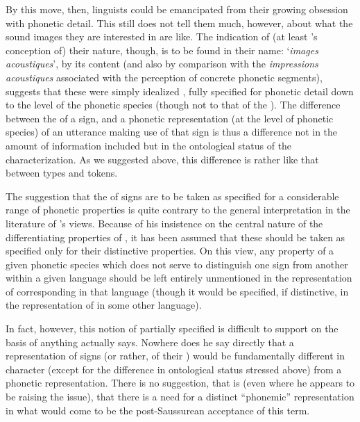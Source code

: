 By this move, then, linguists could be emancipated from their growing
obsession with phonetic detail. This still does not tell them much,
however, about what the sound images they are interested in are
like. The indication of (at least {\Saussure}'s conception of) their
nature, though, is to be found in their name: `\emph{images
  acoustiques}', by its content (and also by comparison with the
\emph{impressions acoustiques} associated with the perception of
concrete phonetic segments), suggests that these were simply idealized
, fully specified for phonetic detail down to
the level of the phonetic species (though not to that of the
). The difference between the \emph{} of a sign, and
a phonetic representation (at the level of phonetic species) of an
utterance making use of that sign is thus a difference not in the
amount of information included but in the ontological status of the
characterization. As we suggested above, this difference is rather
like that between types and tokens.

The suggestion that the \emph{} of signs are to be taken as
specified for a considerable range of phonetic properties is quite
contrary to the general interpretation in the literature of {\Saussure}'s
views. Because of his insistence on the central nature of the
differentiating properties of \emph{}, it has been assumed
that these should be taken as specified only for their distinctive
properties. On this view, any property of a given phonetic species
which does not serve to distinguish one sign from another within a
given language should be left entirely unmentioned in the
representation of corresponding \emph{} in that language
(though it would be specified, if distinctive, in the representation
of \textit{} in some other language).

In fact, however, this notion of partially specified
\emph{} is difficult to support on the basis of anything
{\Saussure} actually says. Nowhere does he say directly that a
representation of signs (or rather, of their \emph{}) would
be fundamentally different in character (except for the difference in
ontological status stressed above) from a phonetic
representation. There is no suggestion, that is (even where he appears
to be raising the issue), that there is a need for a distinct
``phonemic'' representation in what would come to be the post-Saussurean
acceptance of this term.

